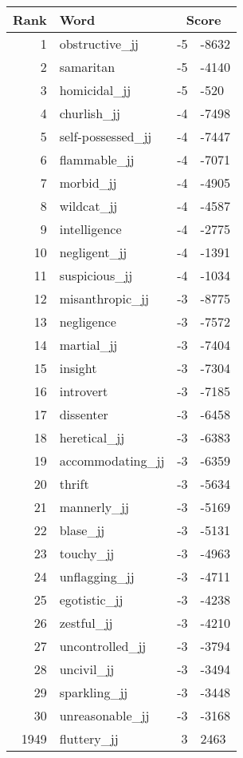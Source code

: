 \begin{longtable}[!htbp]{| rlr@{.}l |}
    \hline
    \textbf{Rank} & \textbf{Word} & \multicolumn{2}{c|}{\textbf{Score}} \\
    \hline
    \endhead
    1 & obstructive\_jj & -5 & -8632 \\
    2 & samaritan & -5 & -4140 \\
    3 & homicidal\_jj & -5 & -520 \\
    4 & churlish\_jj & -4 & -7498 \\
    5 & self-possessed\_jj & -4 & -7447 \\
    6 & flammable\_jj & -4 & -7071 \\
    7 & morbid\_jj & -4 & -4905 \\
    8 & wildcat\_jj & -4 & -4587 \\
    9 & intelligence & -4 & -2775 \\
    10 & negligent\_jj & -4 & -1391 \\
    11 & suspicious\_jj & -4 & -1034 \\
    12 & misanthropic\_jj & -3 & -8775 \\
    13 & negligence & -3 & -7572 \\
    14 & martial\_jj & -3 & -7404 \\
    15 & insight & -3 & -7304 \\
    16 & introvert & -3 & -7185 \\
    17 & dissenter & -3 & -6458 \\
    18 & heretical\_jj & -3 & -6383 \\
    19 & accommodating\_jj & -3 & -6359 \\
    20 & thrift & -3 & -5634 \\
    21 & mannerly\_jj & -3 & -5169 \\
    22 & blase\_jj & -3 & -5131 \\
    23 & touchy\_jj & -3 & -4963 \\
    24 & unflagging\_jj & -3 & -4711 \\
    25 & egotistic\_jj & -3 & -4238 \\
    26 & zestful\_jj & -3 & -4210 \\
    27 & uncontrolled\_jj & -3 & -3794 \\
    28 & uncivil\_jj & -3 & -3494 \\
    29 & sparkling\_jj & -3 & -3448 \\
    30 & unreasonable\_jj & -3 & -3168 \\
    1949 & fluttery\_jj & 3 & 2463 \\

\end{longtable}

